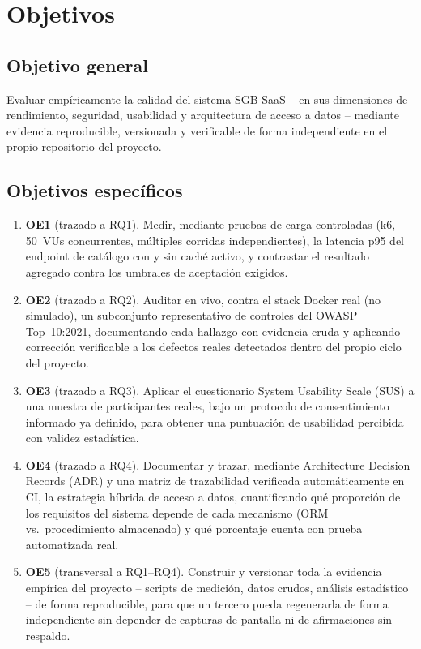 \section{Objetivos}

\subsection{Objetivo general}

Evaluar empíricamente la calidad del sistema SGB-SaaS -- en sus
dimensiones de rendimiento, seguridad, usabilidad y arquitectura de
acceso a datos -- mediante evidencia reproducible, versionada y
verificable de forma independiente en el propio repositorio del
proyecto.

\subsection{Objetivos específicos}

\begin{enumerate}[leftmargin=1.2cm]
  \item \textbf{OE1} (trazado a RQ1). Medir, mediante pruebas de carga
    controladas (k6, 50~VUs concurrentes, múltiples corridas
    independientes), la latencia p95 del endpoint de catálogo con y sin
    caché activo, y contrastar el resultado agregado contra los
    umbrales de aceptación exigidos.
  \item \textbf{OE2} (trazado a RQ2). Auditar en vivo, contra el stack
    Docker real (no simulado), un subconjunto representativo de
    controles del OWASP Top~10:2021, documentando cada hallazgo con
    evidencia cruda y aplicando corrección verificable a los defectos
    reales detectados dentro del propio ciclo del proyecto.
  \item \textbf{OE3} (trazado a RQ3). Aplicar el cuestionario System
    Usability Scale (SUS) a una muestra de participantes reales, bajo un
    protocolo de consentimiento informado ya definido, para obtener una
    puntuación de usabilidad percibida con validez estadística.
  \item \textbf{OE4} (trazado a RQ4). Documentar y trazar, mediante
    Architecture Decision Records (ADR) y una matriz de trazabilidad
    verificada automáticamente en CI, la estrategia híbrida de acceso a
    datos, cuantificando qué proporción de los requisitos del sistema
    depende de cada mecanismo (ORM vs.\ procedimiento almacenado) y qué
    porcentaje cuenta con prueba automatizada real.
  \item \textbf{OE5} (transversal a RQ1--RQ4). Construir y versionar
    toda la evidencia empírica del proyecto -- scripts de medición,
    datos crudos, análisis estadístico -- de forma reproducible, para
    que un tercero pueda regenerarla de forma independiente sin
    depender de capturas de pantalla ni de afirmaciones sin respaldo.
\end{enumerate}

